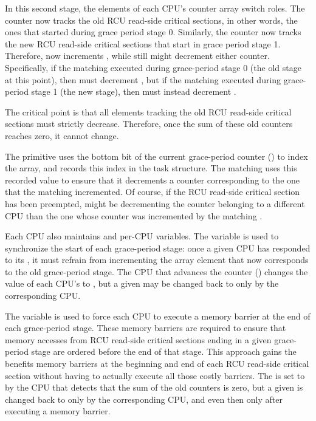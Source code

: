 In this second stage, the elements of each CPU's 
counter array switch roles.
The  counter now tracks the old RCU read-side
critical sections, in other words, the ones that started during
grace period stage 0.
Similarly, the  counter now tracks the new
RCU read-side critical sections that start in grace period stage 1.
Therefore,  now increments
, while  still
might decrement either counter.
Specifically, if the matching  executed
during grace-period stage 0 (the old stage at this point), then
 must decrement ,
but if the matching  executed during
grace-period stage 1 (the new stage), then 
must instead decrement .

The critical point is that all  elements
tracking the old RCU read-side critical sections must strictly decrease.
Therefore, once the sum of these old counters reaches zero,
it cannot change.

The  primitive uses the bottom
bit of the current grace-period counter
() to index the
 array,
and records this index in the task structure.
The matching  uses this recorded
value to ensure that it decrements a counter corresponding to
the one that the matching  incremented.
Of course, if the RCU read-side critical section has been preempted,
 might be decrementing the counter
belonging to a different CPU than the one whose counter was incremented
by the matching .

Each CPU also maintains  and
 per-CPU variables.
The  variable is used to synchronize the
start of each grace-period stage: once a given CPU has responded
to its , it must refrain from incrementing
the  array element that now corresponds to
the old grace-period stage.
The CPU that advances the counter ()
changes the value of each CPU's  to
, but a given 
may be changed back to  only by
the corresponding CPU.

The  variable is used to force each CPU to
execute a memory barrier at the end of each grace-period stage.
These memory barriers are required to ensure that memory accesses from
RCU read-side critical sections ending in a given grace-period stage
are ordered before the end of that stage.
This approach gains the benefits memory barriers at the
beginning and end of each RCU read-side critical section without
having to actually execute all those costly barriers.
The  is set to  by
the CPU that detects that the sum of the old counters is zero,
but a given  is changed back to
 only by the corresponding CPU, and even
then only after executing a memory barrier.

